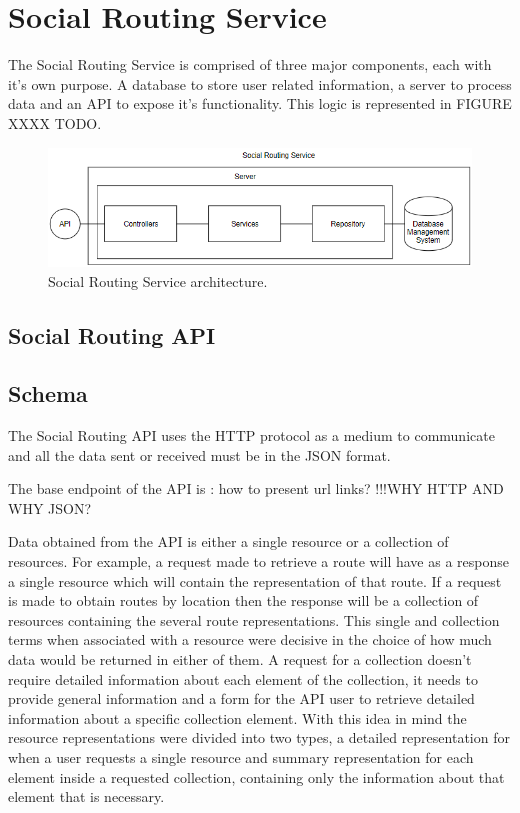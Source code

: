 \section{Social Routing Service}

The Social Routing Service is comprised of three major components, each with it's own purpose. 
A database to store user related information, a server to process data and an API to expose it's functionality.
This logic is represented in FIGURE XXXX TODO.

\begin{figure}[h]            
    \includegraphics[width=\textwidth]{images/project-structure/service-structure.PNG}
    \caption{Social Routing Service architecture.}
\end{figure}  

\subsection*{Social Routing API}

    \subsection*{Schema}
        The Social Routing API uses the HTTP protocol as a medium to communicate and all the data sent or received 
        must be in the JSON format.

        The base endpoint of the API is : how to present url links?
        !!!WHY HTTP AND WHY JSON?

        Data obtained from the API is either a single resource or a collection of resources. For example, a request
        made to retrieve a route will have as a response a single resource which will contain the representation of that
        route. If a request is made to obtain routes by location then the response will be a collection of resources containing
        the several route representations.
        This single and collection terms when associated with a resource were decisive in the choice of how much data would 
        be returned in either of them. A request for a collection doesn't require detailed information about each element of the
        collection, it needs to provide general information and a form for the API user to retrieve detailed information about a specific 
        collection element. 
        With this idea in mind the resource representations were divided into two types, a detailed representation for when a user
        requests a single resource and summary representation for each element inside a requested collection, containing only the 
        information about that element that is necessary.

